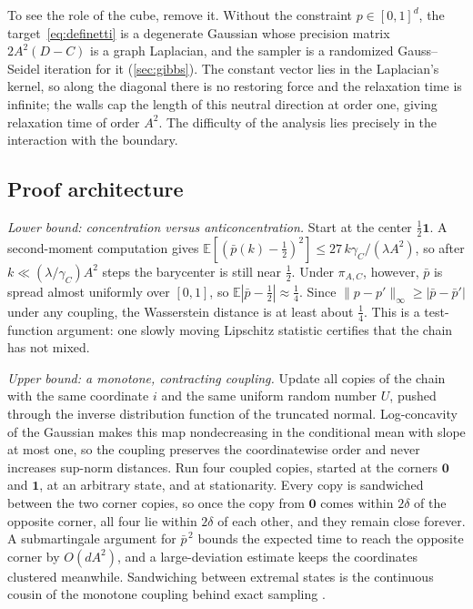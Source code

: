 \documentclass[11pt]{article}
\theoremstyle{remark}
\newcommand{\E}{\mathbb{E}}
\begin{document}
To see the role of the cube, remove it. Without the constraint $p\in[0,1]^d$, the target~\eqref{eq:definetti} is a degenerate Gaussian whose precision matrix $2A^2(D-C)$ is a graph Laplacian, and the sampler is a randomized Gauss--Seidel iteration for it (\cref{sec:gibbs}). The constant vector lies in the Laplacian's kernel, so along the diagonal there is no restoring force and the relaxation time is infinite; the walls cap the length of this neutral direction at order one, giving relaxation time of order $A^2$. The difficulty of the analysis lies precisely in the interaction with the boundary.

\subsection{Proof architecture}
\emph{Lower bound: concentration versus anticoncentration.} Start at the center $\frac12\mathbf 1$. A second-moment computation gives $\E[(\bar p(k)-\frac12)^2]\le 27\,k\gamma_C/(\lambda A^2)$, so after $k\ll(\lambda/\gamma_C)A^2$ steps the barycenter is still near $\frac12$. Under $\pi_{A,C}$, however, $\bar p$ is spread almost uniformly over $[0,1]$, so $\E|\bar p-\frac12|\approx\frac14$. Since $\|p-p'\|_\infty\ge|\bar p-\bar p'|$ under any coupling, the Wasserstein distance is at least about $\frac14$. This is a test-function argument: one slowly moving Lipschitz statistic certifies that the chain has not mixed.

\emph{Upper bound: a monotone, contracting coupling.} Update all copies of the chain with the same coordinate $i$ and the same uniform random number $U$, pushed through the inverse distribution function of the truncated normal. Log-concavity of the Gaussian makes this map nondecreasing in the conditional mean with slope at most one, so the coupling preserves the coordinatewise order and never increases sup-norm distances. Run four coupled copies, started at the corners $\mathbf 0$ and $\mathbf 1$, at an arbitrary state, and at stationarity. Every copy is sandwiched between the two corner copies, so once the copy from $\mathbf 0$ comes within $2\delta$ of the opposite corner, all four lie within $2\delta$ of each other, and they remain close forever. A submartingale argument for $\bar p^{\,2}$ bounds the expected time to reach the opposite corner by $O(dA^2)$, and a large-deviation estimate keeps the coordinates clustered meanwhile. Sandwiching between extremal states is the continuous cousin of the monotone coupling behind exact sampling \citep{propp1996exact}.
\end{document}
